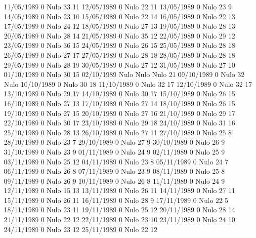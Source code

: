 11/05/1989  0     Nulo    33     11 
12/05/1989  0     Nulo    22     11 
13/05/1989  0     Nulo    23     9 
14/05/1989  0     Nulo    23     10 
15/05/1989  0     Nulo    22     14 
16/05/1989  0     Nulo    22     13 
17/05/1989  0     Nulo    24     12 
18/05/1989  0     Nulo    27     13 
19/05/1989  0     Nulo    28     13 
20/05/1989  0     Nulo    28     14 
21/05/1989  0     Nulo    35     12 
22/05/1989  0     Nulo    29     12 
23/05/1989  0     Nulo    36     15 
24/05/1989  0     Nulo    26     15 
25/05/1989  0     Nulo    28     18 
26/05/1989  0     Nulo    27     17 
27/05/1989  0     Nulo    28     18 
28/05/1989  0     Nulo    28     18 
29/05/1989  0     Nulo    28     19 
30/05/1989  0     Nulo    27     12 
31/05/1989  0     Nulo    27     10 
01/10/1989  0     Nulo    30     15 
02/10/1989 Nulo   Nulo   Nulo    21 
09/10/1989  0     Nulo    32    Nulo
10/10/1989  0     Nulo    30     18 
11/10/1989  0     Nulo    32     17 
12/10/1989  0     Nulo    32     17 
13/10/1989  0     Nulo    29     17 
14/10/1989  0     Nulo    30     17 
15/10/1989  0     Nulo    26     15 
16/10/1989  0     Nulo    27     13 
17/10/1989  0     Nulo    27     14 
18/10/1989  0     Nulo    26     15 
19/10/1989  0     Nulo    27     15 
20/10/1989  0     Nulo    27     16 
21/10/1989  0     Nulo    29     17 
22/10/1989  0     Nulo    30     17 
23/10/1989  0     Nulo    29     18 
24/10/1989  0     Nulo    31     16 
25/10/1989  0     Nulo    28     13 
26/10/1989  0     Nulo    27     11 
27/10/1989  0     Nulo    25     8 
28/10/1989  0     Nulo    23     7 
29/10/1989  0     Nulo    27     9 
30/10/1989  0     Nulo    26     9 
31/10/1989  0     Nulo    23     9 
01/11/1989  0     Nulo    24     9 
02/11/1989  0     Nulo    25     9 
03/11/1989  0     Nulo    25     12 
04/11/1989  0     Nulo    23     8 
05/11/1989  0     Nulo    24     7 
06/11/1989  0     Nulo    26     8 
07/11/1989  0     Nulo    23     9 
08/11/1989  0     Nulo    25     8 
09/11/1989  0     Nulo    26     9 
10/11/1989  0     Nulo    26     8 
11/11/1989  0     Nulo    24     9 
12/11/1989  0     Nulo    15     13 
13/11/1989  0     Nulo    26     11 
14/11/1989  0     Nulo    27     11 
15/11/1989  0     Nulo    26     11 
16/11/1989  0     Nulo    28     9 
17/11/1989  0     Nulo    22     5 
18/11/1989  0     Nulo    23     11 
19/11/1989  0     Nulo    25     12 
20/11/1989  0     Nulo    28     14 
21/11/1989  0     Nulo    22     12 
22/11/1989  0     Nulo    23     10 
23/11/1989  0     Nulo    24     10 
24/11/1989  0     Nulo    23     12 
25/11/1989  0     Nulo    22     12 
